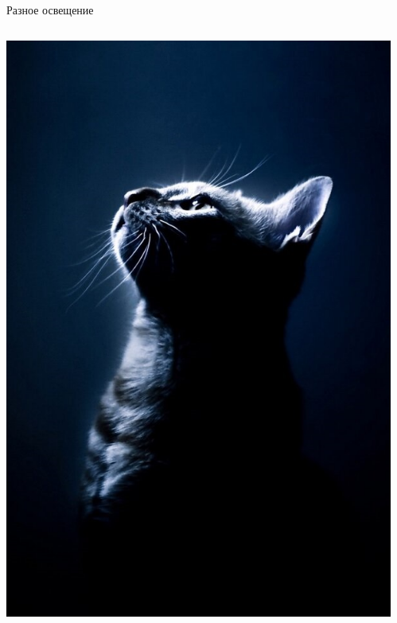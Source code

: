 \documentclass[aspectratio=169, professionalfonts]{beamer}
\begin{document}
\begin{frame}{Разное освещение}
\begin{columns}
\begin{column}{.25\linewidth}
            \includegraphics[width=\linewidth]{figures/fig20-cat.jpg}
        \end{column}
        \begin{column}{.25\linewidth}
            \centering

\end{column}
\end{columns}
\end{frame}
\end{document}
